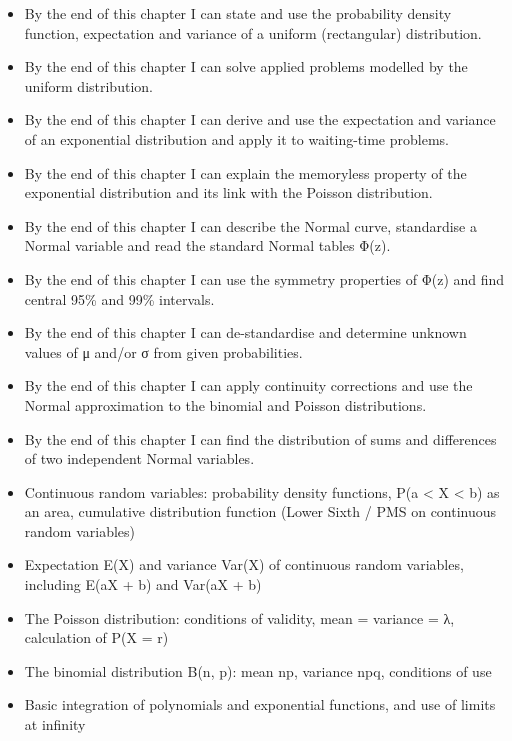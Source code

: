 \documentclass[11pt]{article}
\begin{document}
\begin{objectifs}
\begin{itemize}
\item By the end of this chapter I can state and use the probability density function, expectation and variance of a uniform (rectangular) distribution.
\item By the end of this chapter I can solve applied problems modelled by the uniform distribution.
\item By the end of this chapter I can derive and use the expectation and variance of an exponential distribution and apply it to waiting-time problems.
\item By the end of this chapter I can explain the memoryless property of the exponential distribution and its link with the Poisson distribution.
\item By the end of this chapter I can describe the Normal curve, standardise a Normal variable and read the standard Normal tables Φ(z).
\item By the end of this chapter I can use the symmetry properties of Φ(z) and find central 95\% and 99\% intervals.
\item By the end of this chapter I can de-standardise and determine unknown values of μ and/or σ from given probabilities.
\item By the end of this chapter I can apply continuity corrections and use the Normal approximation to the binomial and Poisson distributions.
\item By the end of this chapter I can find the distribution of sums and differences of two independent Normal variables.
\end{itemize}
\end{objectifs}

\begin{prerequis}
\begin{itemize}
\item Continuous random variables: probability density functions, P(a < X < b) as an area, cumulative distribution function (Lower Sixth / PMS on continuous random variables)
\item Expectation E(X) and variance Var(X) of continuous random variables, including E(aX + b) and Var(aX + b)
\item The Poisson distribution: conditions of validity, mean = variance = λ, calculation of P(X = r)
\item The binomial distribution B(n, p): mean np, variance npq, conditions of use
\item Basic integration of polynomials and exponential functions, and use of limits at infinity
\end{itemize}
\end{prerequis}
\end{document}
